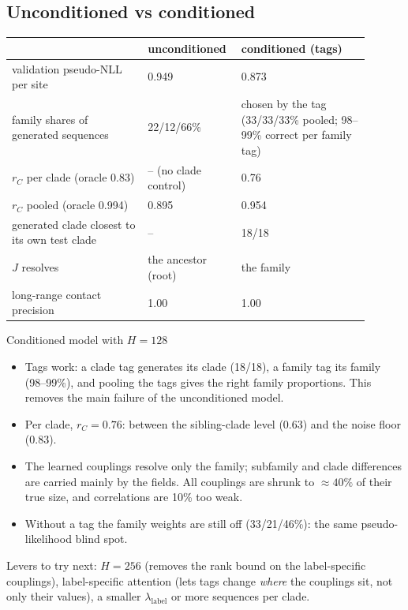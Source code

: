 \subsection{Unconditioned vs conditioned}
\begin{center}\small
\begin{tabular}{p{0.36\linewidth}p{0.2\linewidth}p{0.34\linewidth}}
\toprule
 & unconditioned & conditioned (tags)\\
\midrule
validation pseudo-NLL per site & 0.949 & 0.873\\
family shares of generated sequences & 22/12/66\% & chosen by the tag (33/33/33\% pooled; 98--99\% correct per family tag)\\
$r_C$ per clade (oracle 0.83) & -- (no clade control) & 0.76\\
$r_C$ pooled (oracle 0.994) & 0.895 & 0.954\\
generated clade closest to its own test clade & -- & 18/18\\
$J$ resolves & the ancestor (root) & the family\\
long-range contact precision & 1.00 & 1.00\\
\bottomrule
\end{tabular}
\end{center}

\begin{keybox}{Conditioned model with $H=128$}
\begin{itemize}[nosep]
\item[+] Tags work: a clade tag generates its clade (18/18), a family tag its family (98--99\%), and pooling
      the tags gives the right family proportions. This removes the main failure of the unconditioned model.
\item[+] Per clade, $r_C=0.76$: between the sibling-clade level (0.63) and the noise floor (0.83).
\item[--] The learned couplings resolve only the family; subfamily and clade differences are carried mainly by
      the fields. All couplings are shrunk to $\approx40\%$ of their true size, and correlations are 10\% too weak.
\item[--] Without a tag the family weights are still off (33/21/46\%): the same pseudo-likelihood blind spot.
\end{itemize}
Levers to try next: $H=256$ (removes the rank bound on the label-specific couplings), label-specific
attention (lets tags change \emph{where} the couplings sit, not only their values), a smaller
$\lambda_{\text{label}}$ or more sequences per clade.
\end{keybox}
